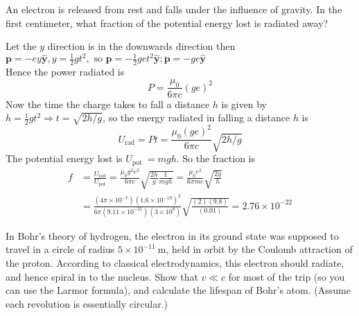 \begin{exercise}
 An electron is released from rest and falls under the influence of gravity. In the first centimeter, what fraction of the potential energy lost is radiated away?
\end{exercise}
\begin{answer}
Let the $y$ direction is in the downwards direction then\\
$\mathbf{p}=-e y \hat{\mathbf{y}}, y=\frac{1}{2} g t^{2}, \text { so } \mathbf{p}=-\frac{1}{2} g e t^{2} \hat{\mathbf{y}} ; \ddot{\mathbf{p}}=-g e \hat{\mathbf{y}}$\\
Hence the power radiated is
$$
P=\frac{\mu_{0}}{6 \pi c}(g e)^{2}
$$
Now the time the charge takes to fall a distance $h$ is given by $h=\frac{1}{2} g t^{2} \Rightarrow t=\sqrt{2 h / g}$, so the energy radiated in falling a distance $h$ is
$$
U_{\mathrm{rad}}=P t=\frac{\mu_{0}(g e)^{2}}{6 \pi c} \sqrt{2 h / g}
$$
The potential energy lost is $U_{\text {pot }}=m g h$. So the fraction is
$$
\begin{aligned}
f &=\frac{U_{\mathrm{rad}}}{U_{\mathrm{pot}}}=\frac{\mu_{0} g^{2} e^{2}}{6 \pi c} \sqrt{\frac{2 h}{g} \frac{1}{m g h}}=\frac{\mu_{0} e^{2}}{6 \pi m c} \sqrt{\frac{2 g}{h}} \\
&=\frac{\left(4 \pi \times 10^{-7}\right)\left(1.6 \times 10^{-19}\right)^{2}}{6 \pi\left(9.11 \times 10^{-31}\right)\left(3 \times 10^{8}\right)} \sqrt{\frac{(2)(9.8)}{(0.01)}}=2.76 \times 10^{-22}
\end{aligned}
$$
\end{answer}
\begin{exercise}
	 In Bohr's theory of hydrogen, the electron in its ground state was supposed to travel in a circle of radius $5 \times 10^{-11} \mathrm{~m}$, held in orbit by the Coulomb attraction of the proton. According to classical electrodynamics, this electron should radiate, and hence spiral in to the nucleus. Show that $v \ll c$ for most of the trip (so you can use the Larmor formula), and calculate the lifespan of Bohr's atom. (Assume each revolution is essentially circular.)
\end{exercise}
